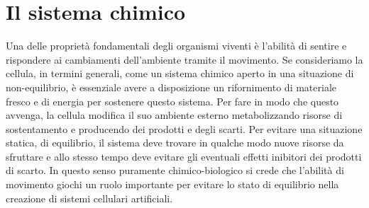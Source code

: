 \chapter{Il sistema chimico}
\vspace{0.5cm}
\label{cha:789}

Una delle proprietà fondamentali degli organismi viventi è l'abilità di sentire e rispondere ai cambiamenti dell'ambiente tramite il movimento. 
Se consideriamo la cellula, in termini generali, come un sistema chimico aperto in una situazione di non-equilibrio, è essenziale avere a disposizione un rifornimento di materiale fresco e di energia per sostenere questo sistema. Per fare in modo che questo avvenga, la cellula modifica il suo ambiente esterno metabolizzando risorse di sostentamento e producendo dei prodotti e degli scarti. Per evitare una situazione statica, di equilibrio, il sistema deve trovare in qualche modo nuove risorse da sfruttare e allo stesso tempo deve evitare gli eventuali effetti inibitori dei prodotti di scarto. In questo senso puramente chimico-biologico si crede che l'abilità di movimento giochi un ruolo importante per evitare lo stato di equilibrio nella creazione di sistemi cellulari artificiali. \cite{doi:10.1021/ja0706955}

